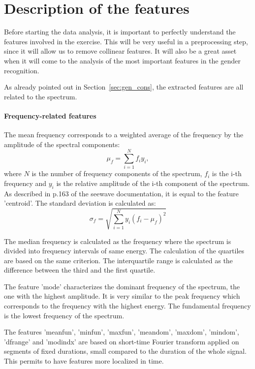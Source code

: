 \section{Description of the features}
\label{sec:feat_desc}
Before starting the data analysis, it is important to perfectly understand the features involved in the exercise. This will be very useful in a preprocessing step, since it will allow us to remove collinear features. It will also be a great asset when it will come to the analysis of the most important features in the gender recognition.

As already pointed out in Section~\ref{sec:gen_cons}, the extracted features are all related to the spectrum. 
\paragraph{Frequency-related features}
The mean frequency corresponds to a weighted average of the frequency by the amplitude of the spectral components:
\begin{equation}
\mu_f = \sum\limits_{i=1}^{N} f_i y_i ,
\end{equation} 
where $N$ is the number of frequency components of the spectrum, $f_i$ is the i-th frequency and $y_i$ is the relative amplitude of the i-th component of the spectrum. 
As described in p.\num{163} of the seewave documentation, it is equal to the feature 'centroid'.
The standard deviation is calculated as:
\begin{equation}
\sigma_f = \sqrt{\sum\limits_{i=1}^{N}y_i \left(f_i-\mu_f\right)^2}
\end{equation}

The median frequency is calculated as the frequency where the spectrum is divided into frequency intervals of same energy. The calculation of the quartiles are based on the same criterion. The interquartile range is calculated as the difference between the third and the first quartile.

The feature 'mode' characterizes the dominant frequency of the spectrum, \ie the one with the highest amplitude. It is very similar to the peak frequency which corresponds to the frequency with the highest energy. The fundamental frequency is the lowest frequency of the spectrum.

The features 'meanfun', 'minfun', 'maxfun', 'meandom', 'maxdom', 'mindom', 'dfrange' and 'modindx' are based on short-time Fourier transform applied on segments of fixed durations, small compared to the duration of the whole signal. This permits to have features more localized in time.

